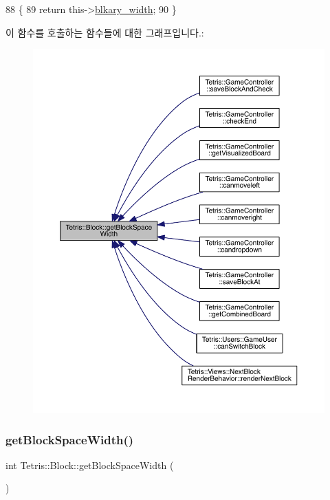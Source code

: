 \begin{DoxyCode}
88                              \{
89                 \textcolor{keywordflow}{return} this->\hyperlink{class_tetris_1_1_block_a96548cab58eb788af744b54192c7bea1}{blkary\_width};
90             \}
\end{DoxyCode}
이 함수를 호출하는 함수들에 대한 그래프입니다.\+:
\nopagebreak
\begin{figure}[H]
\begin{center}
\leavevmode
\includegraphics[width=350pt]{df/d05/class_tetris_1_1_block_ac390e14de476582300d815d9054ed9bd_icgraph}
\end{center}
\end{figure}
\mbox{\label{class_tetris_1_1_block_ac390e14de476582300d815d9054ed9bd}} 
\subsubsection{\texorpdfstring{get\+Block\+Space\+Width()}{getBlockSpaceWidth()}\hspace{0.1cm}{\footnotesize\ttfamily [2/2]}}
{\footnotesize\ttfamily int Tetris\+::\+Block\+::get\+Block\+Space\+Width (\begin{DoxyParamCaption}{ }\end{DoxyParamCaption})\hspace{0.3cm}{\ttfamily [inline]}}


